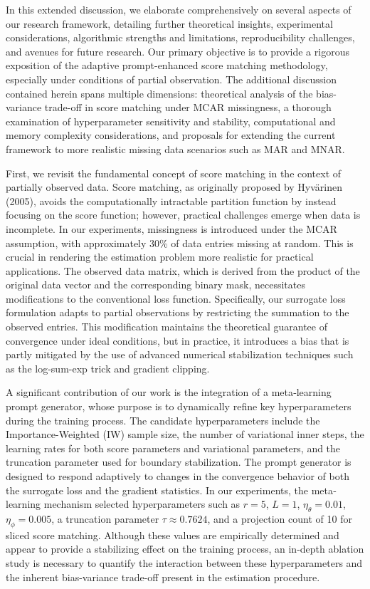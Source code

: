 \documentclass{article}
\begin{document}
In this extended discussion, we elaborate comprehensively on several aspects of our research framework, detailing further theoretical insights, experimental considerations, algorithmic strengths and limitations, reproducibility challenges, and avenues for future research. Our primary objective is to provide a rigorous exposition of the adaptive prompt-enhanced score matching methodology, especially under conditions of partial observation. The additional discussion contained herein spans multiple dimensions: theoretical analysis of the bias-variance trade-off in score matching under MCAR missingness, a thorough examination of hyperparameter sensitivity and stability, computational and memory complexity considerations, and proposals for extending the current framework to more realistic missing data scenarios such as MAR and MNAR.

First, we revisit the fundamental concept of score matching in the context of partially observed data. Score matching, as originally proposed by Hyv\"arinen (2005), avoids the computationally intractable partition function by instead focusing on the score function; however, practical challenges emerge when data is incomplete. In our experiments, missingness is introduced under the MCAR assumption, with approximately 30\% of data entries missing at random. This is crucial in rendering the estimation problem more realistic for practical applications. The observed data matrix, which is derived from the product of the original data vector and the corresponding binary mask, necessitates modifications to the conventional loss function. Specifically, our surrogate loss formulation adapts to partial observations by restricting the summation to the observed entries. This modification maintains the theoretical guarantee of convergence under ideal conditions, but in practice, it introduces a bias that is partly mitigated by the use of advanced numerical stabilization techniques such as the log-sum-exp trick and gradient clipping.

A significant contribution of our work is the integration of a meta‐learning prompt generator, whose purpose is to dynamically refine key hyperparameters during the training process. The candidate hyperparameters include the Importance-Weighted (IW) sample size, the number of variational inner steps, the learning rates for both score parameters and variational parameters, and the truncation parameter used for boundary stabilization. The prompt generator is designed to respond adaptively to changes in the convergence behavior of both the surrogate loss and the gradient statistics. In our experiments, the meta‐learning mechanism selected hyperparameters such as \(r=5\), \(L=1\), \(\eta_\theta=0.01\), \(\eta_\phi=0.005\), a truncation parameter \(\tau \approx 0.7624\), and a projection count of 10 for sliced score matching. Although these values are empirically determined and appear to provide a stabilizing effect on the training process, an in‐depth ablation study is necessary to quantify the interaction between these hyperparameters and the inherent bias-variance trade-off present in the estimation procedure.
\end{document}
